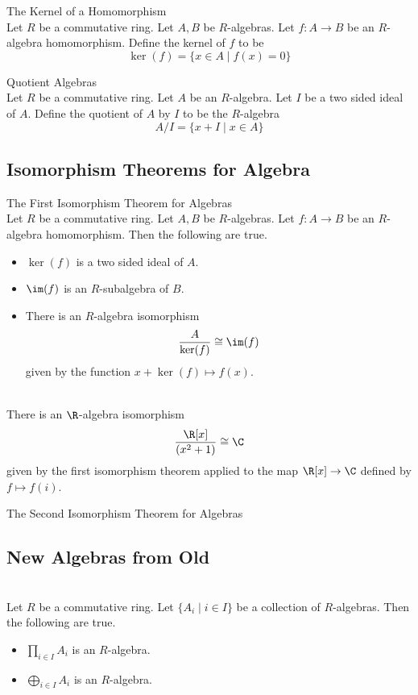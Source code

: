 \documentclass[a4paper]{article}
\begin{document}
\begin{defn}{The Kernel of a Homomorphism}{}\\
Let $R$ be a commutative ring. Let $A,B$ be $R$-algebras. Let $f:A\to B$ be an $R$-algebra homomorphism. Define the kernel of $f$ to be $$\ker(f)=\{x\in A\;|\;f(x)=0\}$$
\end{defn}

\begin{defn}{Quotient Algebras}{}\\
Let $R$ be a commutative ring. Let $A$ be an $R$-algebra. Let $I$ be a two sided ideal of $A$. Define the quotient of $A$ by $I$ to be the $R$-algebra $$A/I=\{x+I\;|\;x\in A\}$$
\end{defn}

\subsection{Isomorphism Theorems for Algebra}
\begin{thm}{The First Isomorphism Theorem for Algebras}{}\\
Let $R$ be a commutative ring. Let $A,B$ be $R$-algebras. Let $f:A\to B$ be an $R$-algebra homomorphism. Then the following are true. 
\begin{itemize}
\item $\ker(f)$ is a two sided ideal of $A$. 
\item $\im(f)$ is an $R$-subalgebra of $B$. 
\item There is an $R$-algebra isomorphism $$\frac{A}{\ker(f)}\cong\im(f)$$ given by the function $x+\ker(f)\mapsto f(x)$. 
\end{itemize}
\end{thm}

\begin{eg}{}{}\\
There is an $\R$-algebra isomorphism $$\frac{\R[x]}{(x^2+1)}\cong\C$$ given by the first isomorphism theorem applied to the map $\R[x]\to\C$ defined by $f\mapsto f(i)$. 
\end{eg}

\begin{thm}{The Second Isomorphism Theorem for Algebras}{}\\
\end{thm}

\subsection{New Algebras from Old}
\begin{prp}{}{}\\
Let $R$ be a commutative ring. Let $\{A_i\;|\;i\in I\}$ be a collection of $R$-algebras. Then the following are true. 
\begin{itemize}
\item $\prod_{i\in I}A_i$ is an $R$-algebra. 
\item $\bigoplus_{i\in I}A_i$ is an $R$-algebra. 
\end{itemize}
\end{prp}
\end{document}
